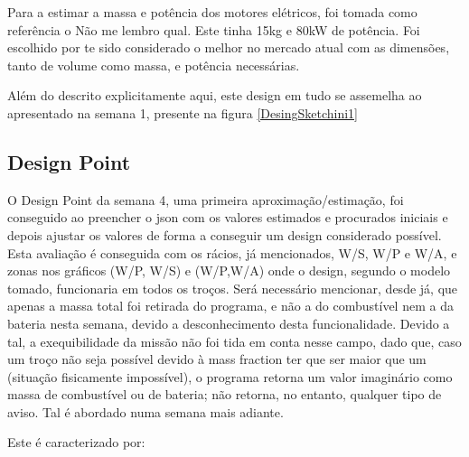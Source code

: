 Para a estimar a massa e potência dos motores elétricos, foi tomada como referência o {\Large\textbf{}{Não me lembro qual}}. Este tinha 15kg e 80kW de potência. Foi escolhido por te sido considerado o melhor no mercado atual com as dimensões, tanto de volume como massa, e potência necessárias.\par
Além do descrito explicitamente aqui, este design em tudo se assemelha ao apresentado na semana 1, presente na figura \ref{DesingSketchini1}
\subsection{Design Point}
O Design Point da semana 4, uma primeira aproximação/estimação, foi conseguido ao preencher o json com os valores estimados e procurados iniciais e depois ajustar os valores de forma a conseguir um design considerado possível. Esta avaliação é conseguida com os rácios, já mencionados, W/S, W/P e W/A, e zonas nos gráficos (W/P, W/S) e (W/P,W/A) onde o design, segundo o modelo tomado, funcionaria em todos os troços. Será necessário mencionar, desde já, que apenas a massa total foi retirada do programa, e não a do combustível nem a da bateria nesta semana, devido a desconhecimento desta funcionalidade. Devido a tal, a exequibilidade da missão não foi tida em conta nesse campo, dado que, caso um troço não seja possível devido à mass fraction ter que ser maior que um (situação fisicamente impossível), o programa retorna um valor imaginário como massa de combustível ou de bateria; não retorna, no entanto, qualquer tipo de aviso. Tal é abordado numa semana mais adiante.\par
Este é caracterizado por:\par
\FloatBarrier
